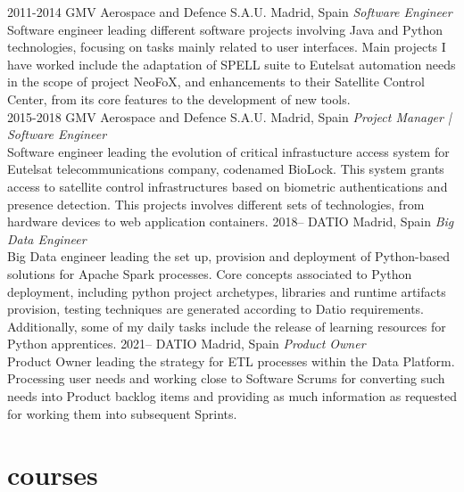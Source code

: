 \documentclass[]{friggeri-cv}
\begin{document}
\begin{entrylist}
\entry
{2011-2014}
{GMV Aerospace and Defence S.A.U.}
{Madrid, Spain}
{\emph{Software Engineer} \\
Software engineer leading different software projects involving Java and Python technologies, focusing on tasks mainly related to user interfaces.
Main projects I have worked include the adaptation of SPELL suite to Eutelsat automation needs in the scope of project NeoFoX, and enhancements to
their Satellite Control Center, from its core features to the development of new tools.} \\
\entry
{2015-2018}
{GMV Aerospace and Defence S.A.U.}
{Madrid, Spain}
{\emph{Project Manager | Software Engineer} \\
Software engineer leading the evolution of critical infrastucture access system for Eutelsat telecommunications company, codenamed BioLock. This system
grants access to satellite control infrastructures based on biometric authentications and presence detection.
This projects involves different sets of technologies, from hardware devices to web application containers.}
\entry
{2018--}
{DATIO}
{Madrid, Spain}
{\emph{Big Data Engineer} \\
Big Data engineer leading the set up, provision and deployment of Python-based solutions for Apache Spark processes.
Core concepts associated to Python deployment, including python project archetypes, libraries and runtime artifacts provision, testing techniques are
generated according to Datio requirements. Additionally, some of my daily tasks include the release of learning resources for Python apprentices.}
\entry
{2021--}
{DATIO}
{Madrid, Spain}
{\emph{Product Owner} \\
Product Owner leading the strategy for ETL processes within the Data Platform.
Processing user needs and working close to Software Scrums for converting such needs into Product backlog items and providing as much information as requested for working them into subsequent Sprints.}
\end{entrylist}


\section{courses}
\end{document}
